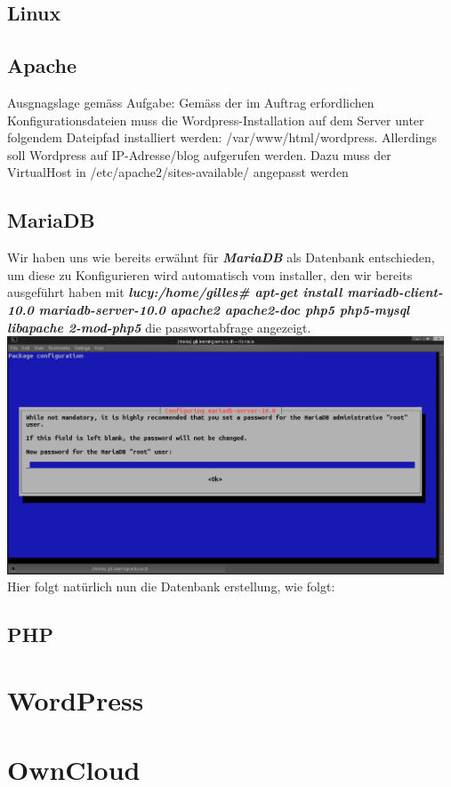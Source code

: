 \documentclass{article}
\begin{document}
	\subsection{Linux}
	\subsection{Apache}
	Ausgnagslage gemäss Aufgabe:
	\newline
	Gemäss der im Auftrag erfordlichen Konfigurationsdateien muss die Wordpress-Installation auf dem Server unter folgendem Dateipfad installiert werden: /var/www/html/wordpress.
	\linebreak 
	\noindent\hspace*{5mm} Allerdings soll Wordpress auf IP-Adresse/blog aufgerufen werden. Dazu muss der VirtualHost in /etc/apache2/sites-available/ angepasst werden
	\subsection{MariaDB}
	Wir haben uns wie bereits erwähnt für \textit{\textbf{MariaDB}}  als Datenbank entschieden, um diese zu Konfigurieren wird automatisch vom installer, den wir bereits ausgeführt haben mit \textit{\textbf{lucy:/home/gilles\# apt-get install mariadb-client-10.0 mariadb-server-10.0 apache2 apache2-doc php5 php5-mysql libapache 2-mod-php5}} die passwortabfrage angezeigt.
	\newline
	\newline
	\includegraphics[width=13cm]{../Pics/3-lamp-stack-mariadb}
	\newline
	\newline
	Hier folgt natürlich nun die Datenbank erstellung, wie folgt:
	\subsection{PHP}
	\section{WordPress}
	\section{OwnCloud}
\end{document}
